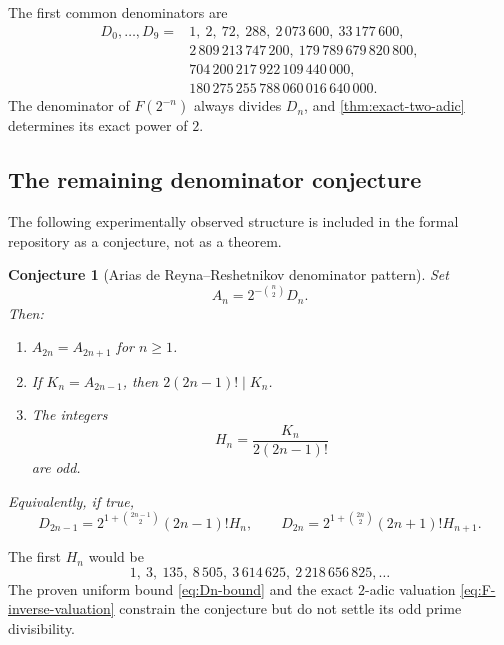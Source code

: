 \documentclass[11pt,oneside]{article}
\newtheorem{conjecture}[theorem]{Conjecture}
\theoremstyle{definition}
\theoremstyle{remark}
\begin{document}
The first common denominators are
\begin{equation}\label{eq:first-D-values}
\begin{split}
 D_0,\ldots,D_9={}&1,\ 2,\ 72,\ 288,\ 2\,073\,600,\ 33\,177\,600,\\
 &2\,809\,213\,747\,200,\ 179\,789\,679\,820\,800,\\
 &704\,200\,217\,922\,109\,440\,000,\\
 &180\,275\,255\,788\,060\,016\,640\,000.
\end{split}
\end{equation}
The denominator of $F(2^{-n})$ always divides $D_n$, and
\cref{thm:exact-two-adic} determines its exact power of $2$.

\subsection{The remaining denominator conjecture}

The following experimentally observed structure is included in the formal
repository as a conjecture, not as a theorem.

\begin{conjecture}[Arias de Reyna--Reshetnikov denominator pattern]\label{conj:denominator}
Set
\begin{equation}\label{eq:An-def}
  A_n=2^{-\binom n2}D_n.
\end{equation}
Then:
\begin{enumerate}
\item $A_{2n}=A_{2n+1}$ for $n\ge1$.
\item If $K_n=A_{2n-1}$, then $2(2n-1)!\mid K_n$.
\item The integers
\begin{equation}\label{eq:Hn-def}
  H_n=\frac{K_n}{2(2n-1)!}
\end{equation}
are odd.
\end{enumerate}
Equivalently, if true,
\begin{equation}\label{eq:D-conjectural-forms}
 D_{2n-1}=2^{1+\binom{2n-1}{2}}(2n-1)!H_n,
 \qquad
 D_{2n}=2^{1+\binom{2n}{2}}(2n+1)!H_{n+1}.
\end{equation}
\end{conjecture}

The first $H_n$ would be
\[
  1,\ 3,\ 135,\ 8\,505,\ 3\,614\,625,\ 2\,218\,656\,825,\ldots
\]
The proven uniform bound \eqref{eq:Dn-bound} and the exact $2$-adic valuation
\eqref{eq:F-inverse-valuation} constrain the conjecture but do not settle its odd
prime divisibility.
\end{document}
